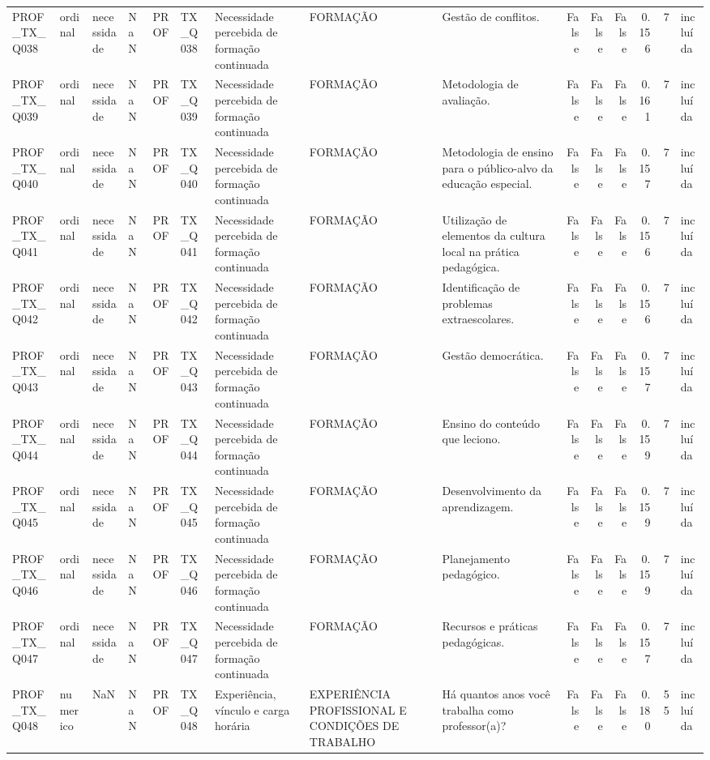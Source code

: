 \begin{tabular}{lllllllllrrrrrl}
PROF\_TX\_Q038 & ordinal & necessidade & NaN & PROF & TX\_Q038 & Necessidade percebida de formação continuada & FORMAÇÃO & Gestão de conflitos. & False & False & False & 0.156 & 7 & incluída \\
PROF\_TX\_Q039 & ordinal & necessidade & NaN & PROF & TX\_Q039 & Necessidade percebida de formação continuada & FORMAÇÃO & Metodologia de avaliação. & False & False & False & 0.161 & 7 & incluída \\
PROF\_TX\_Q040 & ordinal & necessidade & NaN & PROF & TX\_Q040 & Necessidade percebida de formação continuada & FORMAÇÃO & Metodologia de ensino para o público-alvo da educação especial. & False & False & False & 0.157 & 7 & incluída \\
PROF\_TX\_Q041 & ordinal & necessidade & NaN & PROF & TX\_Q041 & Necessidade percebida de formação continuada & FORMAÇÃO & Utilização de elementos da cultura local na prática pedagógica. & False & False & False & 0.156 & 7 & incluída \\
PROF\_TX\_Q042 & ordinal & necessidade & NaN & PROF & TX\_Q042 & Necessidade percebida de formação continuada & FORMAÇÃO & Identificação de problemas extraescolares. & False & False & False & 0.156 & 7 & incluída \\
PROF\_TX\_Q043 & ordinal & necessidade & NaN & PROF & TX\_Q043 & Necessidade percebida de formação continuada & FORMAÇÃO & Gestão democrática. & False & False & False & 0.157 & 7 & incluída \\
PROF\_TX\_Q044 & ordinal & necessidade & NaN & PROF & TX\_Q044 & Necessidade percebida de formação continuada & FORMAÇÃO & Ensino do conteúdo que leciono. & False & False & False & 0.159 & 7 & incluída \\
PROF\_TX\_Q045 & ordinal & necessidade & NaN & PROF & TX\_Q045 & Necessidade percebida de formação continuada & FORMAÇÃO & Desenvolvimento da aprendizagem. & False & False & False & 0.159 & 7 & incluída \\
PROF\_TX\_Q046 & ordinal & necessidade & NaN & PROF & TX\_Q046 & Necessidade percebida de formação continuada & FORMAÇÃO & Planejamento pedagógico. & False & False & False & 0.159 & 7 & incluída \\
PROF\_TX\_Q047 & ordinal & necessidade & NaN & PROF & TX\_Q047 & Necessidade percebida de formação continuada & FORMAÇÃO & Recursos e práticas pedagógicas. & False & False & False & 0.157 & 7 & incluída \\
PROF\_TX\_Q048 & numerico & NaN & NaN & PROF & TX\_Q048 & Experiência, vínculo e carga horária & EXPERIÊNCIA PROFISSIONAL E CONDIÇÕES DE TRABALHO & Há quantos anos você trabalha como professor(a)? & False & False & False & 0.180 & 55 & incluída \\

\end{tabular}
